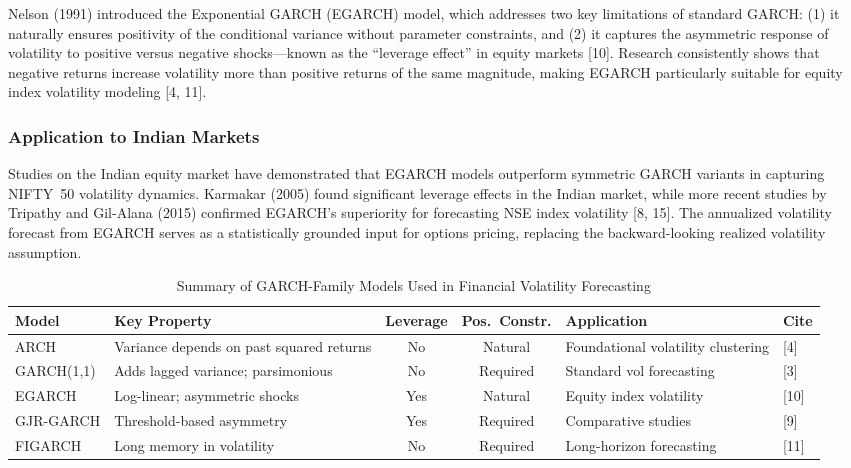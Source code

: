 \documentclass[12pt,a4paper]{article}
\begin{document}
Nelson (1991) introduced the Exponential GARCH (EGARCH) model, which addresses two key limitations of standard GARCH: (1) it naturally ensures positivity of the conditional variance without parameter constraints, and (2) it captures the asymmetric response of volatility to positive versus negative shocks---known as the ``leverage effect'' in equity markets [10]. Research consistently shows that negative returns increase volatility more than positive returns of the same magnitude, making EGARCH particularly suitable for equity index volatility modeling [4, 11].

\subsubsection{Application to Indian Markets}

Studies on the Indian equity market have demonstrated that EGARCH models outperform symmetric GARCH variants in capturing NIFTY~50 volatility dynamics. Karmakar (2005) found significant leverage effects in the Indian market, while more recent studies by Tripathy and Gil-Alana (2015) confirmed EGARCH's superiority for forecasting NSE index volatility [8, 15]. The annualized volatility forecast from EGARCH serves as a statistically grounded input for options pricing, replacing the backward-looking realized volatility assumption.

\begin{table}[H]
\centering
\caption{Summary of GARCH-Family Models Used in Financial Volatility Forecasting}
\label{tab:garch_models}
\small
\begin{tabularx}{\textwidth}{l X c c X l}
\toprule
\textbf{Model} & \textbf{Key Property} & \textbf{Leverage} & \textbf{Pos.\ Constr.} & \textbf{Application} & \textbf{Cite} \\
\midrule
ARCH & Variance depends on past squared returns & No & Natural & Foundational volatility clustering & [4] \\
GARCH(1,1) & Adds lagged variance; parsimonious & No & Required & Standard vol forecasting & [3] \\
EGARCH & Log-linear; asymmetric shocks & Yes & Natural & Equity index volatility & [10] \\
GJR-GARCH & Threshold-based asymmetry & Yes & Required & Comparative studies & [9] \\
FIGARCH & Long memory in volatility & No & Required & Long-horizon forecasting & [11] \\
\bottomrule
\end{tabularx}
\end{table}
\end{document}
